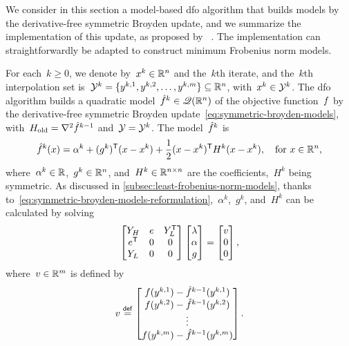 We consider in this section a model-based \gls{dfo} algorithm that builds models by the derivative-free symmetric Broyden update, and we summarize the implementation of this update, as proposed by \citeauthor{Powell_2004b}~\cite{Powell_2004b,Powell_2004c}.
The implementation can straightforwardly be adapted to construct minimum Frobenius norm models.

For each~$k \ge 0$, we denote by~$\iter[k] \in \R^n$ and the~$k$th iterate, and the~$k$th interpolation set is~$\xpt[k] = \set{y^{k, 1}, y^{k, 2}, \dots, y^{k, m}} \subseteq \R^n$, with~$\iter[k] \in \xpt[k]$.
The \gls{dfo} algorithm builds a quadratic model~$\objm[k] \in \qpoly$ of the objective function~$f$ by the derivative-free symmetric Broyden update~\cref{eq:symmetric-broyden-models}, with~$H_{\text{old}} = \nabla^2 \objm[k - 1]$ and~$\xpt = \xpt[k]$.
The model~$\objm[k]$ is
\begin{equation*}
    \objm[k](\iter) = \alpha^k + (g^k)^{\T} (\iter - \iter[k]) + \frac{1}{2} (\iter - \iter[k])^{\T} H^k (\iter - \iter[k]), \quad \text{for~$\iter \in \R^n$},
\end{equation*}
where~$\alpha^k \in \mathbb{R}$,~$g^k \in \mathbb{R}^n$, and~$H^k \in \mathbb{R}^{n \times n}$ are the coefficients,~$H^k$ being symmetric.
As discussed in \cref{subsec:least-frobenius-norm-models}, thanks to~\cref{eq:symmetric-broyden-models-reformulation},~$\alpha^k$,~$g^k$, and~$H^k$ can be calculated by solving
\begin{equation}
    \label{eq:least-frobenius-kkt-system-2}
    \begin{bmatrix}
        Y_H     & e & Y_L^{\T}\\
        e^{\T}  & 0 & 0\\
        Y_L     & 0 & 0
    \end{bmatrix}
    \begin{bmatrix}
        \lm\\
        \alpha\\
        g
    \end{bmatrix}
    =
    \begin{bmatrix}
        v\\
        0\\
        0
    \end{bmatrix},
\end{equation}
where~$v \in \mathbb{R}^m$ is defined by
\begin{equation*}
    v \eqdef
    \begin{bmatrix}
        \obj(y^{k, 1}) - \objm[k - 1](y^{k, 1})\\
        \obj(y^{k, 2}) - \objm[k - 1](y^{k, 2})\\
        \vdots\\
        \obj(y^{k, m}) - \objm[k - 1](y^{k, m})
    \end{bmatrix}.
\end{equation*}
